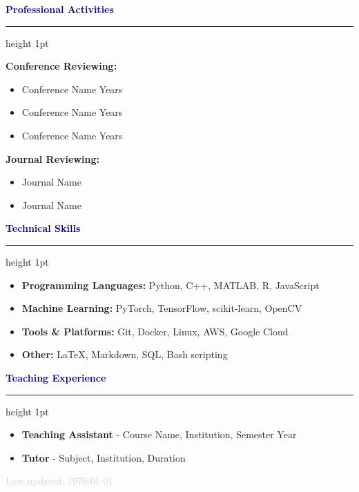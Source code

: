 \documentclass[11pt, a4paper]{article}
\newcommand{\sectioncolor}[1]{\textcolor{darkblue}{#1}}
\newcommand{\secondarycolor}[1]{\textcolor{lightgray}{#1}}
\newcommand{\cvsection}[1]{%
    \vspace{10pt}%
    {\Large\bfseries\sectioncolor{#1}}%
    \vspace{2pt}%
    \hrule height 1pt%
    \vspace{8pt}%
}
\begin{document}
\cvsection{Professional Activities}

\textbf{Conference Reviewing:}
\begin{itemize}[leftmargin=15pt, itemsep=2pt, label={\scriptsize\faCircle}]
    \item Conference Name Years
    \item Conference Name Years
    \item Conference Name Years
\end{itemize}

\textbf{Journal Reviewing:}
\begin{itemize}[leftmargin=15pt, itemsep=2pt, label={\scriptsize\faCircle}]
    \item Journal Name
    \item Journal Name
\end{itemize}

\cvsection{Technical Skills}

\begin{itemize}[leftmargin=0pt, itemsep=4pt]
    \item \textbf{Programming Languages:} Python, C++, MATLAB, R, JavaScript
    \item \textbf{Machine Learning:} PyTorch, TensorFlow, scikit-learn, OpenCV
    \item \textbf{Tools \& Platforms:} Git, Docker, Linux, AWS, Google Cloud
    \item \textbf{Other:} LaTeX, Markdown, SQL, Bash scripting
\end{itemize}

\cvsection{Teaching Experience}

\begin{itemize}[leftmargin=0pt, itemsep=6pt]
    \item \textbf{Teaching Assistant} - Course Name, Institution, Semester Year
    \item \textbf{Tutor} - Subject, Institution, Duration
\end{itemize}

\vspace{20pt}

\begin{center}
    \secondarycolor{\small Last updated: \today}
\end{center}
\end{document}
